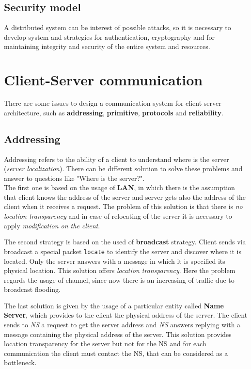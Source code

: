 \documentclass[11pt,a4paper]{article}
\begin{document}
\subsection{Security model}
A distributed system can be interest of possible attacks, so it is necessary to develop system and strategies for authentication, cryptography and for maintaining integrity and security of the entire system and resources. 

\section{Client-Server communication}
There are some issues to design a communication system for client-server architecture, such as \textbf{addressing}, \textbf{primitive}, \textbf{protocols} and \textbf{reliability}.
\subsection{Addressing}
Addressing refers to the ability of a client to understand where is the server (\textit{server localization}). There can be different solution to solve these problems and answer to questions like "Where is the server?". \\
The first one is based on the usage of \textbf{LAN}, in which there is the assumption that client knows the address of the server and server gets also the address of the client when it receives a request.
The problem of this solution is that there is \textit{no location transparency} and in case of relocating of the server it is necessary to apply \textit{modification on the client}.
\par \medskip \noindent
The second strategy is based on the used of \textbf{broadcast} strategy. Client sends via broadcast a special packet \verb!locate! to identify the server and discover where it is located. Only the server answers with a message in which it is specified its physical location. This solution offers \textit{location transparency}.
Here the problem regards the usage of channel, since now there is an increasing of traffic due to broadcast flooding.
\par \medskip \noindent
The last solution is given by the usage of a particular entity called \textbf{Name Server}, which provides to the client the physical address of the server. The client sends to \textit{NS} a request to get the server address and \textit{NS} answers replying with a message containing the physical address of the server.
This solution provides location transparency for the server but not for the NS and for each communication the client must contact the NS, that can be considered as a bottleneck.
\end{document}
